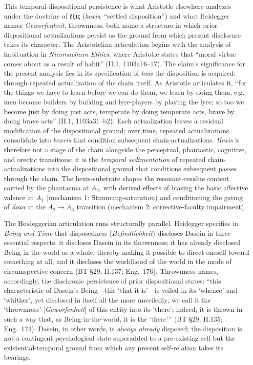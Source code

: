 This temporal-dispositional persistence is what Aristotle elsewhere analyzes under the doctrine of ἕξις (\textit{hexis}, ``settled disposition'') and what Heidegger names \textit{Geworfenheit}, thrownness; both name a structure in which prior dispositional actualizations persist as the ground from which present disclosure takes its character. The Aristotelian articulation begins with the analysis of habituation in \textit{Nicomachean Ethics}, where Aristotle states that ``moral virtue comes about as a result of habit'' (II.1, 1103a16--17). The claim's significance for the present analysis lies in its specification of \textit{how} the disposition is acquired: through repeated actualization of the chain itself. As Aristotle articulates it, ``for the things we have to learn before we can do them, we learn by doing them, e.g. men become builders by building and lyre-players by playing the lyre; so too we become just by doing just acts, temperate by doing temperate acts, brave by doing brave acts'' (II.1, 1103a31--b2). Each actualization leaves a residual modification of the dispositional ground; over time, repeated actualizations consolidate into \textit{hexeis} that condition subsequent chain-actualizations. \textit{Hexis} is therefore not a stage of the chain alongside the perceptual, phantastic, cognitive, and orectic transitions; it is the \textit{temporal sedimentation} of repeated chain-actualizations into the dispositional ground that conditions subsequent passes through the chain. The hexis-substrate shapes the resonant-residue content carried by the phantasma at $A_2$, with derived effects of biasing the basic affective valence at $A_1$ (mechanism 1: Stimmung-saturation) and conditioning the gating of \textit{doxa} at the $A_2 \rightarrow A_3$ transition (mechanism 2: corrective-faculty impairment).

The Heideggerian articulation runs structurally parallel. Heidegger specifies in \textit{Being and Time} that disposedness (\textit{Befindlichkeit}) discloses Dasein in three essential respects: it discloses Dasein in its thrownness; it has already disclosed Being-in-the-world as a whole, thereby making it possible to direct oneself toward something at all; and it discloses the worldhood of the world in the mode of circumspective concern (BT \S29, H.137; Eng.~176). Thrownness names, accordingly, the diachronic persistence of prior dispositional states: ``this characteristic of Dasein's Being---this `that it is'---is veiled in its `whence' and `whither', yet disclosed in itself all the more unveiledly; we call it the `thrownness' [\textit{Geworfenheit}] of this entity into its `there'; indeed, it is thrown in such a way that, as Being-in-the-world, it is the `there''' (BT \S29, H.135; Eng.~174). Dasein, in other words, is \textit{always already} disposed; the disposition is not a contingent psychological state superadded to a pre-existing self but the existential-temporal ground from which any present self-relation takes its bearings.

